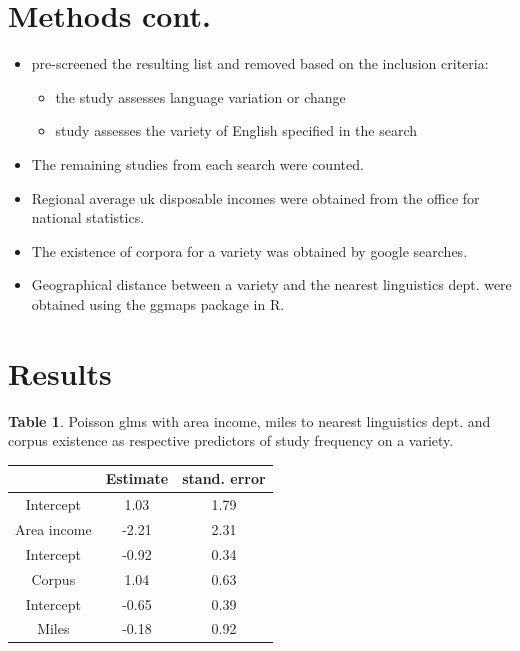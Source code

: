 \documentclass[a0paper,fleqn]{betterposter}
\begin{document}
{
	\section{Methods cont.}	
\begin{itemize}
	\item pre-screened the resulting list and removed based on the inclusion criteria:
	\begin{itemize}
		\item the study assesses language variation or change
		\item study assesses the variety of English specified in the search
	\end{itemize}
	\item The remaining studies from each search were counted.

	\item Regional average uk disposable incomes were obtained from the office for national statistics.
	\item The existence of corpora for a variety was obtained by google searches.
	\item Geographical distance between a variety and the nearest linguistics dept. were obtained using the ggmaps package in R.
\end{itemize}



\section{Results}

\vspace{1cm}
\textbf{Table 1}. Poisson glms with area income, miles to nearest linguistics dept. and corpus existence as respective predictors of study frequency on a variety.

\begin{tabular}{ c c c }
	& Estimate & stand. error\\
	\hline
	Intercept & 1.03 & 1.79	\\
	Area income & -2.21 & 2.31\\
	\hline
	Intercept & -0.92 & 0.34  \\
	Corpus & 1.04 & 0.63 \\
	\hline
	Intercept & -0.65  & 0.39  \\
	Miles & -0.18  & 0.92  \\
\hline
\end{tabular}



}
\end{document}
